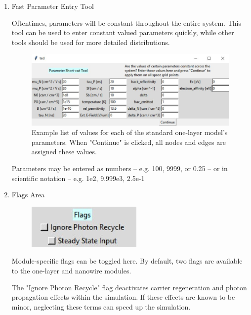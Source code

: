 \documentclass[11pt,letterpaper,titlepage]{article}
\begin{document}
\begin{enumerate}
				\item Fast Parameter Entry Tool
				
				\par Oftentimes, parameters will be constant throughout the entire system. This tool can be used to enter constant valued parameters quickly, while other tools should be used for more detailed distributions.
				
				\begin{figure}[H]
					\label{fig:fast_param_entry_tool}
					\centering
					\includegraphics[scale=0.7]{"fast_param_entry_tool"}
					\caption{Example list of values for each of the standard one-layer model's parameters. When "Continue" is clicked, all nodes and edges are assigned these values.}
				\end{figure}
			
				\par Parameters may be entered as numbers – e.g. 100, 9999, or 0.25 – or in scientific notation – e.g. 1e2, 9.999e3, 2.5e-1
				
				\item Flags Area
				
				\begin{figure}[H]
					\label{fig:flags}
					\centering
					\includegraphics[scale=1.5]{"flags"}
				\end{figure}
				
				\par Module-specific flags can be toggled here. By default, two flags are available to the one-layer and nanowire modules.
				
				\par The "Ignore Photon Recycle" flag deactivates carrier regeneration and photon propagation effects within the simulation. If these effects are known to be minor, neglecting these terms can speed up the simulation.
				

\end{enumerate}
\end{document}
